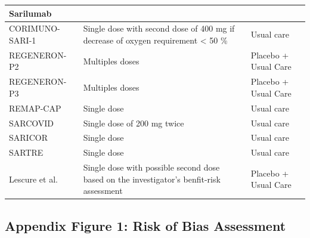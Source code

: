 \documentclass[
  12pt,
]{article}
\begin{document}
\begin{landscape}
\begin{longtable}{lll}
\midrule
\multicolumn{1}{l}{Sarilumab} \\ 
\midrule
CORIMUNO-SARI-1 & Single dose with second dose of 400 mg if decrease of oxygen requirement < 50 \% & Usual care \\ 
REGENERON-P2 & Multiples doses & Placebo + Usual Care \\ 
REGENERON-P3 & Multiples doses & Placebo + Usual Care \\ 
REMAP-CAP & Single dose & Usual care \\ 
SARCOVID & Single dose of 200 mg twice & Usual care \\ 
SARICOR & Single dose & Usual care \\ 
SARTRE & Single dose & Usual care \\ 
Lescure et al. & Single dose with possible second dose based on the investigator's benfit-risk assessment & Placebo + Usual Care \\ 
 \bottomrule
\end{longtable}

\end{landscape}

\restoregeometry

\newpage

\hypertarget{appendix-figure-1-risk-of-bias-assessment}{%
\subsection{Appendix Figure 1: Risk of Bias
Assessment}\label{appendix-figure-1-risk-of-bias-assessment}}
\end{document}
